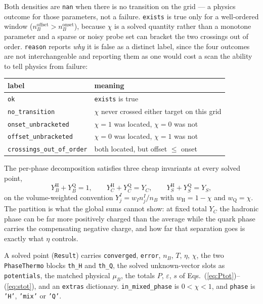 \documentclass[aps,prc,onecolumn,superscriptaddress,nofootinbib,10pt]{revtex4-2}
\newcommand{\nB}{n_B}
\newcommand{\muB}{\mu_B}
\newcommand{\phH}{\mathrm{H}}
\newcommand{\phQ}{\mathrm{Q}}
\begin{document}
Both densities are \texttt{nan} when there is no transition on the grid --- a
physics outcome for those parameters, not a failure. \texttt{exists} is true
only for a well-ordered window ($\nB^{\mathrm{offset}} >
\nB^{\mathrm{onset}}$), because $\chi$ is a solved quantity rather than a
monotone parameter and a sparse or noisy probe set can bracket the two
crossings out of order. \texttt{reason} reports \emph{why} it is false as a
distinct label, since the four outcomes are not interchangeable and reporting
them as one would cost a scan the ability to tell physics from failure:

\begin{center}
\begin{tabular}{ll}
\toprule
label & meaning \\
\midrule
\texttt{ok}                     & \texttt{exists} is true \\
\texttt{no\_transition}         & $\chi$ never crossed either target on this
                                  grid \\
\texttt{onset\_unbracketed}     & $\chi = 1$ was located, $\chi = 0$ was not \\
\texttt{offset\_unbracketed}    & $\chi = 0$ was located, $\chi = 1$ was not \\
\texttt{crossings\_out\_of\_order} & both located, but offset $\le$ onset \\
\bottomrule
\end{tabular}
\end{center}

The per-phase decomposition satisfies three cheap invariants at every solved
point,
%
\begin{equation}
Y_B^\phH + Y_B^\phQ = 1 , \qquad
Y_C^\phH + Y_C^\phQ = Y_C , \qquad
Y_S^\phH + Y_S^\phQ = Y_S ,
\label{eq:partition}
\end{equation}
%
on the volume-weighted convention $Y_j^I = w_I n_j^I / \nB$ with
$w_\phH = 1-\chi$ and $w_\phQ = \chi$. The partition is what the global sums
cannot show: at fixed total $Y_C$ the hadronic phase can be far more
positively charged than the average while the quark phase carries the
compensating negative charge, and how far that separation goes is exactly what
$\eta$ controls.

A solved point (\texttt{Result}) carries \texttt{converged},
\texttt{error}, $\nB$, $T$, $\eta$, $\chi$, the two \texttt{PhaseThermo} blocks
\texttt{th\_H} and \texttt{th\_Q}, the solved unknown-vector slots as
\texttt{potentials}, the matched physical $\muB$, the totals $P$,
$\varepsilon$, $s$ of Eqs.~(\ref{eq:Ptot})--(\ref{eq:stot}), and an
\texttt{extras} dictionary. \texttt{in\_mixed\_phase} is $0 < \chi < 1$, and
\texttt{phase} is \texttt{'H'}, \texttt{'mix'} or \texttt{'Q'}.
\end{document}
